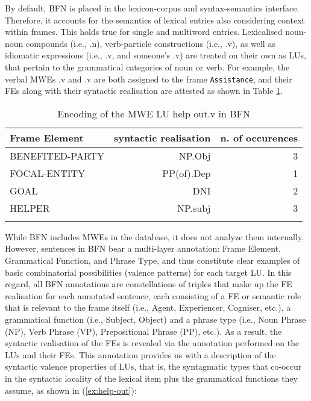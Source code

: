 \documentclass[output=paper,colorlinks,citecolor=brown]{langscibook}
\begin{document}
By default, BFN is placed in the lexicon-corpus and syntax-semantics interface. Therefore, it accounts for the semantics of lexical entries also considering context within frames. This holds true for single and multiword entries. Lexicalised noun-noun compounds (i.e., .n), verb-particle constructions (i.e., .v), as well as idiomatic expressions (i.e., .v, and  someone’s .v) are treated on their own as LUs, that pertain to the grammatical categories of noun or verb. For example, the verbal MWEs .v and .v are both assigned to the frame \texttt{Assistance}, and their FEs along with their syntactic realisation are attested as shown in Table \ref{tab:help-out.v}.

\begin{table}
\caption{Encoding of the MWE LU help out.v in BFN}
\label{tab:help-out.v}
 \begin{tabularx}{.8\textwidth}{X rr}
  \lsptoprule
  Frame Element         & syntactic realisation  & n. of occurences \\
  \midrule
  {BENEFITED-PARTY}  &   NP.Obj  &    3  \\
  {FOCAL-ENTITY}  &   PP(of).Dep &   1   \\
  GOAL  &   DNI &   2  \\
 HELPER  & NP.subj   &	3 \\
  \lspbottomrule
 \end{tabularx}
 \end{table}


While BFN includes MWEs in the database, it does not analyze them internally. However, sentences in BFN bear a multi-layer annotation: Frame Element, Grammatical Function, and Phrase Type, and thus constitute clear examples of basic combinatorial possibilities (valence patterns) for each target LU. In this regard, all BFN annotations are constellations of triples that make up the FE realisation for each annotated sentence, each consisting of a FE or semantic role that is relevant to the frame itself (i.e., Agent, Experiencer, Cogniser, etc.), a grammatical function (i.e., Subject, Object) and a phrase type (i.e., Noun Phrase (NP), Verb Phrase (VP), Prepositional Phrase (PP), etc.). As a result, the syntactic realisation of the FEs is revealed via the annotation performed on the LUs and their FEs. This annotation provides us with a description of the syntactic valence properties of LUs, that is, the syntagmatic types that co-occur in the syntactic locality of the lexical item plus the grammatical functions they assume, as shown in (\ref{ex:help-out}):
\end{document}
